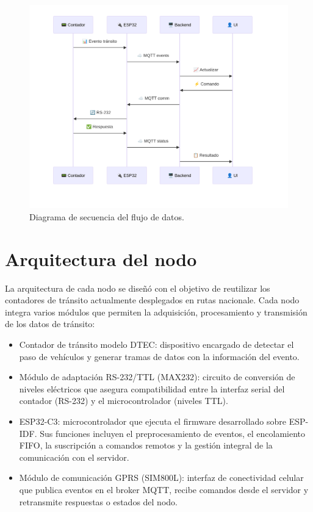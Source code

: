 \begin{figure}[H]
  \centering
  \includegraphics[width=1.15\linewidth]{./Figures/diagSecuencia.png}
  \caption{Diagrama de secuencia del flujo de datos.}
  \label{fig:diag_secuencia}
\end{figure}



\section{Arquitectura del nodo}
La arquitectura de cada nodo se diseñó con el objetivo de reutilizar los contadores de tránsito actualmente desplegados en rutas nacionale. Cada nodo integra varios módulos que permiten la adquisición, procesamiento y transmisión de los datos de tránsito:

\begin{itemize}
    \item Contador de tránsito modelo DTEC: dispositivo encargado de detectar el paso de vehículos y generar tramas de datos con la información del evento.
   
    \item Módulo de adaptación RS-232/TTL (MAX232): circuito de conversión de niveles eléctricos que asegura compatibilidad entre la interfaz serial del contador (RS-232) y el microcontrolador (niveles TTL).
      
    \item ESP32-C3: microcontrolador que ejecuta el firmware desarrollado sobre ESP-IDF. Sus funciones incluyen el preprocesamiento de eventos, el encolamiento FIFO, la suscripción a comandos remotos y la gestión integral de la comunicación con el servidor.
   
    \item Módulo de comunicación GPRS (SIM800L): interfaz de conectividad celular que publica eventos en el broker MQTT, recibe comandos desde el servidor y retransmite respuestas o estados del nodo.
    

\end{itemize}


